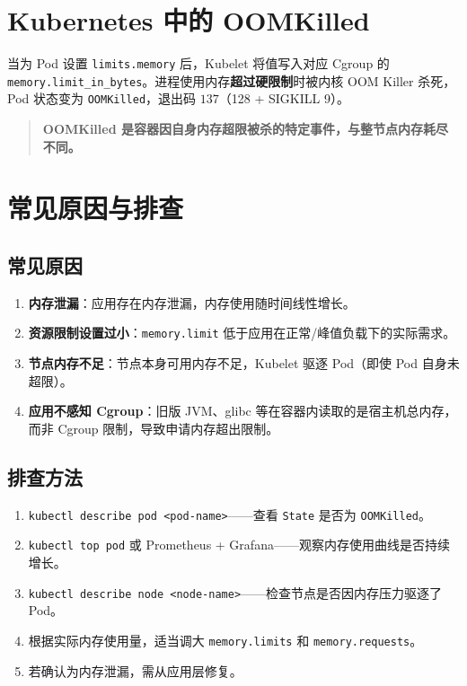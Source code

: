 \section{Kubernetes 中的 OOMKilled}

当为 Pod 设置 \texttt{limits.memory} 后，Kubelet 将值写入对应 Cgroup 的 \texttt{memory.limit\_in\_bytes}。进程使用内存\textbf{超过硬限制}时被内核 OOM Killer 杀死，Pod 状态变为 \texttt{OOMKilled}，退出码 $137$（128 + SIGKILL 9）。

\begin{quote}
\textbf{OOMKilled 是容器因自身内存超限被杀的特定事件，与整节点内存耗尽不同。}
\end{quote}

\section{常见原因与排查}

\subsection*{常见原因}

\begin{enumerate}[leftmargin=2cm]
	\item \textbf{内存泄漏}：应用存在内存泄漏，内存使用随时间线性增长。
	\item \textbf{资源限制设置过小}：\texttt{memory.limit} 低于应用在正常/峰值负载下的实际需求。
	\item \textbf{节点内存不足}：节点本身可用内存不足，Kubelet 驱逐 Pod（即使 Pod 自身未超限）。
	\item \textbf{应用不感知 Cgroup}：旧版 JVM、glibc 等在容器内读取的是宿主机总内存，而非 Cgroup 限制，导致申请内存超出限制。
\end{enumerate}

\subsection*{排查方法}

\begin{enumerate}[leftmargin=2cm]
	\item \texttt{kubectl describe pod <pod-name>}——查看 \texttt{State} 是否为 \texttt{OOMKilled}。
	\item \texttt{kubectl top pod} 或 Prometheus + Grafana——观察内存使用曲线是否持续增长。
	\item \texttt{kubectl describe node <node-name>}——检查节点是否因内存压力驱逐了 Pod。
	\item 根据实际内存使用量，适当调大 \texttt{memory.limits} 和 \texttt{memory.requests}。
	\item 若确认为内存泄漏，需从应用层修复。
\end{enumerate}


